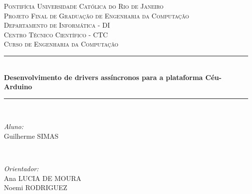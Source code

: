 \documentclass[11pt]{article}
\newcommand\textucsc[1]{\textsc{\MakeUppercase{#1}}}
\begin{document}

\begin{titlepage}

\newcommand{\HRule}{\rule{\linewidth}{0.5mm}} %

\center %
 

\textsc{\LARGE Pontifícia Universidade Católica do Rio de Janeiro}\\[1.5cm] %
\textsc{\Large Projeto Final de Graduação de Engenharia da Computação}\\[0.5cm] %

\textsc{\large Departamento de Informática - DI \\ Centro Técnico Científico - CTC \\ Curso de Engenharia da Computação}\\[0.5cm] %



\newcommand{\titlename}{Desenvolvimento de drivers assíncronos para a plataforma Céu-Arduino}

\HRule \\[0.4cm]
{ \huge \bfseries \titlename}\\[0.4cm] %
\HRule \\[1.5cm]
 

\begin{minipage}{0.4\textwidth}
\begin{flushleft} \large
\emph{Aluno:}\\
Guilherme \textucsc{Simas} %
\end{flushleft}
\end{minipage}
~
\begin{minipage}{0.4\textwidth}
\begin{flushright} \large
\emph{Orientador:} \\
Ana \textucsc{Lucia de Moura} \\ %
Noemi \textucsc{Rodriguez}
\end{flushright}
\end{minipage}\\[4cm]


\end{titlepage}
\end{document}
